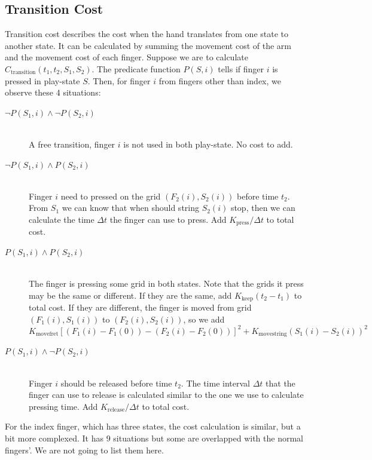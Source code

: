 \subsection{Transition Cost}
Transition cost describes the cost when the hand translates from one state to another state. It can be calculated by summing the movement cost of the arm and the movement cost of each finger. Suppose we are to calculate $C_{\mathrm{transition}}(t_1, t_2, S_1, S_2)$.
The predicate function $P(S, i)$ tells if finger $i$ is pressed in play-state $S$. Then, for finger $i$ from fingers other than index, we observe these 4 situations: 
\begin{description}
    \item[$\lnot P(S_1, i) \land \lnot P(S_2, i)$] \hfill \\
        A free transition, finger $i$ is not used in both play-state. No cost to add.

    \item[$\lnot P(S_1, i) \land P(S_2, i)$] \hfill \\
        Finger $i$ need to pressed on the grid $(F_2(i), S_2(i))$ before time $t_2$. From $S_1$ we can know that when should string $S_2(i)$ stop, then we can calculate the time $\Delta t$ the finger can use to press.
        Add $K_{\mathrm{press}} / \Delta t$ to total cost.

    \item[$P(S_1, i) \land P(S_2, i)$] \hfill \\
        The finger is pressing some grid in both states. Note that the grids it press may be the same or different. If they are the same, add $K_{\mathrm{keep}}(t_2 - t_1)$ to total cost. If they are different, the finger is moved from grid $(F_1(i), S_1(i))$ to $(F_2(i), S_2(i))$,
        so we add \[
        K_{\mathrm{movefret}} \left[ (F_1(i) - F_1(0)) - (F_2(i) - F_2(0)) \right]^2
        + K_{\mathrm{movestring}} \left( S_1(i) - S_2(i)\right)^2
        \]

    \item[$P(S_1, i) \land \lnot P(S_2, i)$] \hfill \\
        Finger $i$ should be released before time $t_2$. The time interval $\Delta t$ that the finger can use to release is calculated similar to the one we use to calculate pressing time. Add $K_{\mathrm{release}} / \Delta t$ to total cost.
\end{description}

For the index finger, which has three states, the cost calculation is similar, but a bit more complexed. It has 9 situations but some are overlapped with the normal fingers'. We are not going to list them here.

